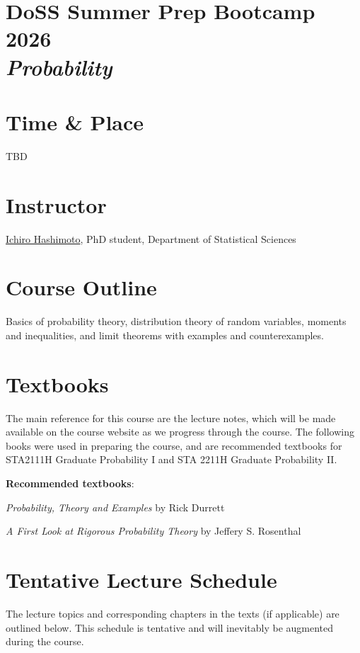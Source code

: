 \documentclass[12pt]{article}
\date{ }
\begin{document}
\section*{DoSS Summer Prep Bootcamp 2026 \\  {\it{Probability}}}

\section{Time \& Place}
TBD

\section{Instructor}
\href{your webpage}{Ichiro Hashimoto}, PhD student, Department of Statistical Sciences



\section{Course Outline}

Basics of probability theory, distribution theory of random variables, moments and inequalities, and limit theorems with examples and counterexamples.

\section{Textbooks}

The main reference for this course are the lecture notes, which will be made available on the course website as we progress through the course. The following books were used in preparing the course, and are recommended textbooks for STA2111H Graduate Probability I and STA 2211H Graduate Probability II. 

\vspace{1.0cm}

{\bf{Recommended textbooks}}:
\vspace{0.1cm}
\noindent

{\emph{Probability, Theory and Examples}} by Rick Durrett

{\emph{A First Look at Rigorous Probability Theory}} by Jeffery S. Rosenthal

\newpage
\section{Tentative Lecture Schedule}
The lecture topics and corresponding chapters in the texts (if applicable) are outlined below.  This schedule is tentative and will inevitably be augmented during the course.  
\end{document}
